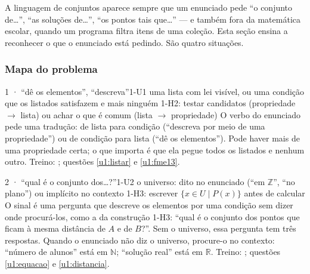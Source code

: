 \OndeEUsado

A linguagem de conjuntos aparece sempre que um enunciado pede \enquote{o conjunto de\ldots}, \enquote{as soluções de\ldots}, \enquote{os pontos tais que\ldots} — e também fora da matemática escolar, quando um programa filtra itens de uma coleção. Esta seção ensina a reconhecer o que o enunciado está pedindo. São quatro situações.

\subsubsection{Mapa do problema}

\begin{caso}{1 · \enquote{dê os elementos}, \enquote{descreva}}{1-U1}
{uma lista com lei visível, ou uma condição que os listados satisfazem e mais ninguém}
{1-H2: testar candidatos (propriedade $\to$ lista) ou achar o que é comum (lista $\to$ propriedade)}
\reconhecer O verbo do enunciado pede uma tradução: de lista para condição (\enquote{descreva por meio de uma propriedade}) ou de condição para lista (\enquote{dê os elementos}). Pode haver mais de uma propriedade certa; o que importa é que ela pegue todos os listados e nenhum outro. Treino: ; questões \ref{u1:listar} e \ref{u1:fme13}.
\end{caso}

\begin{caso}{2 · \enquote{qual é o conjunto dos\ldots?}}{1-U2}
{o universo: dito no enunciado (\enquote{em $\mathbb{Z}$}, \enquote{no plano}) ou implícito no contexto}
{1-H3: escrever $\{x\in U\mid P(x)\}$ antes de calcular}
\reconhecer O sinal é uma pergunta que descreve os elementos por uma condição sem dizer onde procurá-los, como a da construção 1-H3: \enquote{qual é o conjunto dos pontos que ficam à mesma distância de $A$ e de $B$?}. Sem o universo, essa pergunta tem três respostas. Quando o enunciado não diz o universo, procure-o no contexto: \enquote{número de alunos} está em $\mathbb{N}$; \enquote{solução real} está em $\mathbb{R}$. Treino: ; questões \ref{u1:equacao} e \ref{u1:distancia}.
\end{caso}

